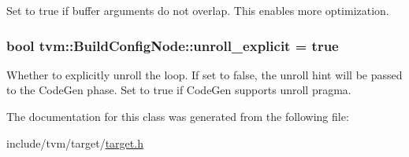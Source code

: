 Set to true if buffer arguments do not overlap. This enables more optimization. 

\subsubsection[{\texorpdfstring{unroll\+\_\+explicit}{unroll_explicit}}]{\setlength{\rightskip}{0pt plus 5cm}bool tvm\+::\+Build\+Config\+Node\+::unroll\+\_\+explicit = true}\hypertarget{classtvm_1_1BuildConfigNode_ab0e01cf0180f09e0e3f3184cc1c01228}{}\label{classtvm_1_1BuildConfigNode_ab0e01cf0180f09e0e3f3184cc1c01228}


Whether to explicitly unroll the loop. If set to false, the unroll hint will be passed to the Code\+Gen phase. Set to true if Code\+Gen supports unroll pragma. 



The documentation for this class was generated from the following file\+:\begin{DoxyCompactItemize}
\item 
include/tvm/target/\hyperlink{target_8h}{target.\+h}\end{DoxyCompactItemize}
